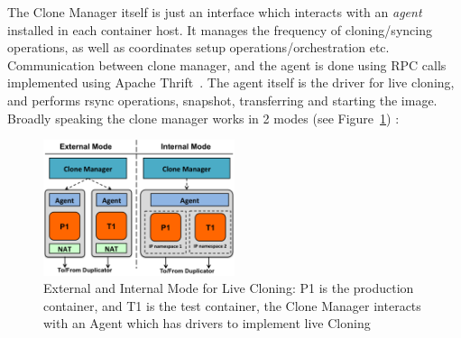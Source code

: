 The Clone Manager itself is just an interface which interacts with an \textit{agent} installed in each container host.
It manages the frequency of cloning/syncing operations, as well as  coordinates setup operations/orchestration etc.
Communication between clone manager, and the agent is done using RPC calls implemented using Apache Thrift~\cite{thrift}.
The agent itself is the driver for live cloning, and performs rsync operations, snapshot, transferring and starting the image.
\fi
Broadly speaking the clone manager works in 2 modes (see Figure~\ref{fig:modesCloning}) : 

\begin{figure}[t]
  \begin{center}
    \includegraphics[width=0.5\textwidth]{figs/ModesCloning.png}
    \caption{External and Internal Mode for Live Cloning: P1 is the production container, and T1 is the test container, the Clone Manager interacts with an Agent which has drivers to implement live Cloning}
    \label{fig:modesCloning}
  \end{center}
\end{figure}

